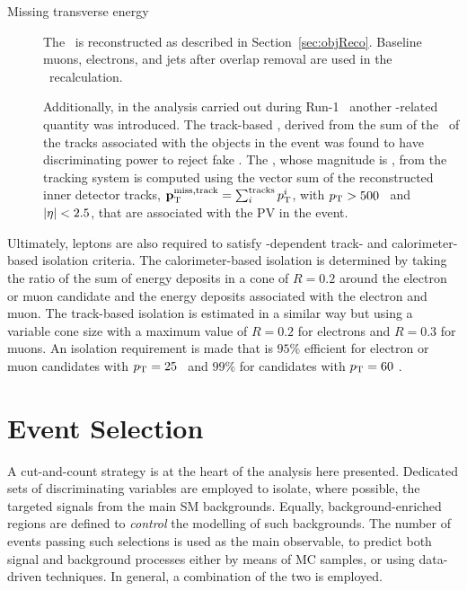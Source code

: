 \begin{description}
			\item[Missing transverse energy]
				The \met\ is reconstructed as described in Section~\ref{sec:objReco}. Baseline muons, electrons, and jets after overlap removal are used in the \met\ recalculation. 

				Additionally, in the analysis carried out during Run-1~\cite{Atlas8TeV} another \met-related quantity was introduced. The track-based \met, derived from the sum of the \pt\ of the tracks associated with the objects in the event was found to have discriminating power to reject fake \met. The \ptmisstrk, whose magnitude is \mettrk, from the tracking system is computed using the vector sum of the reconstructed inner detector tracks, $\mathbf{p}_{\mathrm{T}}^{\mathrm{miss, track}} = \sum_i^{\mathrm{tracks}} p_{\mathrm{T}}^i$, with $p_{\mathrm{T}} > 500$ \MeV\ and $|\eta| < 2.5$, that are associated with the \ac{PV} in the event. 
 		\end{description}

		Ultimately, leptons are also required to satisfy \pt-dependent track- and calorimeter-based isolation criteria. The calorimeter-based isolation is determined by taking the ratio of the sum of energy deposits in a cone of $R = 0.2$ around the electron or muon candidate and the energy deposits associated with the electron and muon. The track-based isolation is estimated in a similar way but using a variable cone size with a maximum value of $R = 0.2$ for electrons and $R = 0.3$ for muons. An isolation requirement is made that is $95\%$ efficient for electron or muon candidates with $p_{\mathrm{T}} = 25$ \GeV\ and $99\%$ for candidates with $p_{\mathrm{T}} = 60$ \GeV.


	\section{Event Selection}
	\label{sec:evtsel}

		A cut-and-count strategy is at the heart of the analysis here presented. Dedicated sets of discriminating variables are employed to isolate, where possible, the targeted signals from the main \ac{SM} backgrounds. Equally, background-enriched regions are defined to \emph{control} the modelling of such backgrounds. The number of events passing such selections is used as the main observable, to predict both signal and background processes either by means of \ac{MC} samples, or using data-driven techniques. In general, a combination of the two is employed. 

